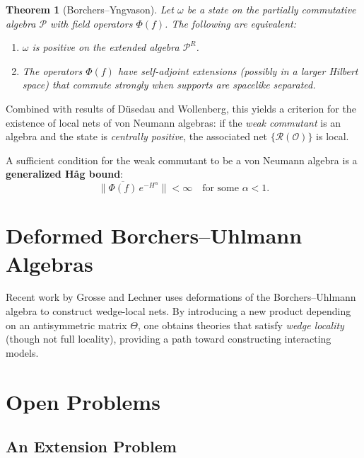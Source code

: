 \documentclass[11pt,a4paper]{article}
\newtheorem{theorem}{Theorem}[section]
\begin{document}
\begin{theorem}[Borchers--Yngvason]
Let $\omega$ be a state on the partially commutative algebra $\mathcal{P}$
with field operators $\Phi(f)$. The following are equivalent:
\begin{enumerate}[nosep]
  \item $\omega$ is positive on the extended algebra $\mathcal{P}^R$.
  \item The operators $\Phi(f)$ have self-adjoint extensions (possibly in
        a larger Hilbert space) that commute strongly when supports are
        spacelike separated.
\end{enumerate}
\end{theorem}

Combined with results of D\"usedau and Wollenberg, this yields a criterion
for the existence of local nets of von Neumann algebras: if the
\emph{weak commutant} is an algebra and the state is \emph{centrally positive},
the associated net $\{\mathcal{R}(\mathcal{O})\}$ is local.

A sufficient condition for the weak commutant to be a von Neumann algebra
is a \textbf{generalized H\aa g bound}:
\begin{equation}
  \bigl\|\overline{\Phi(f)}\, e^{-H^\alpha}\bigr\| < \infty
  \quad\text{for some } \alpha < 1.
\end{equation}

\section{Deformed Borchers--Uhlmann Algebras}

Recent work by Grosse and Lechner uses deformations of the Borchers--Uhlmann
algebra to construct wedge-local nets. By introducing a new product
depending on an antisymmetric matrix $\Theta$, one obtains theories that
satisfy \emph{wedge locality} (though not full locality), providing a
path toward constructing interacting models.

\section{Open Problems}

\subsection{An Extension Problem}
\end{document}
